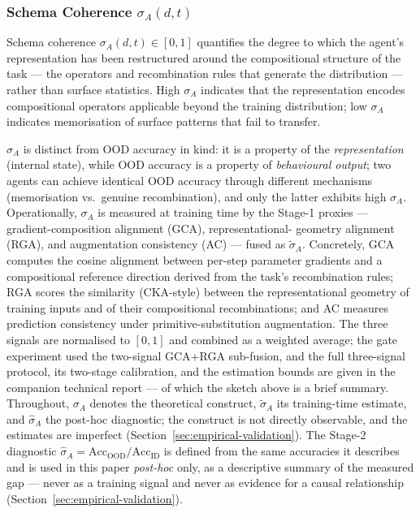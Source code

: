 \documentclass{article}
\theoremstyle{definition}
\begin{document}
\subsubsection{Schema Coherence \texorpdfstring{$\sigma_A(d,t)$}{sigma\_A(d,t)}}\label{sec:schema-coherence}

Schema coherence $\sigma_A(d,t) \in [0,1]$ quantifies the degree to
which the agent's representation has been restructured around the
compositional structure of the task --- the operators and recombination
rules that generate the distribution --- rather than surface statistics.
High $\sigma_A$ indicates that the representation encodes compositional
operators applicable beyond the training distribution; low $\sigma_A$
indicates memorisation of surface patterns that fail to transfer.

$\sigma_A$ is distinct from OOD accuracy in kind: it is a property of
the \emph{representation} (internal state), while OOD accuracy is a
property of \emph{behavioural output}; two agents can achieve identical
OOD accuracy through different mechanisms (memorisation vs.\ genuine
recombination), and only the latter exhibits high $\sigma_A$.
Operationally, $\sigma_A$ is measured at training time by the Stage-1
proxies --- gradient-composition alignment (GCA), representational-
geometry alignment (RGA), and augmentation consistency (AC) --- fused as
$\tilde{\sigma}_A$. Concretely, GCA computes the cosine alignment
between per-step parameter gradients and a compositional reference
direction derived from the task's recombination rules; RGA scores the
similarity (CKA-style) between the representational geometry of
training inputs and of their compositional recombinations; and AC
measures prediction consistency under primitive-substitution
augmentation. The three signals are normalised to $[0,1]$ and combined
as a weighted average; the gate experiment used the two-signal GCA+RGA
sub-fusion, and the full three-signal protocol, its two-stage
calibration, and the estimation bounds are given in the companion
technical report --- of which the sketch above is a brief summary.
Throughout, $\sigma_A$ denotes the theoretical construct, $\tilde{\sigma}_A$
its training-time estimate, and $\hat{\sigma}_A$ the post-hoc diagnostic;
the construct is not directly observable, and the estimates are
imperfect (Section~\ref{sec:empirical-validation}). The Stage-2 diagnostic
$\hat{\sigma}_A = \text{Acc}_{\text{OOD}}/\text{Acc}_{\text{ID}}$ is
defined from the same accuracies it describes and is used in this paper
\emph{post-hoc} only, as a descriptive summary of the measured gap ---
never as a training signal and never as evidence for a causal
relationship (Section~\ref{sec:empirical-validation}).
\end{document}
